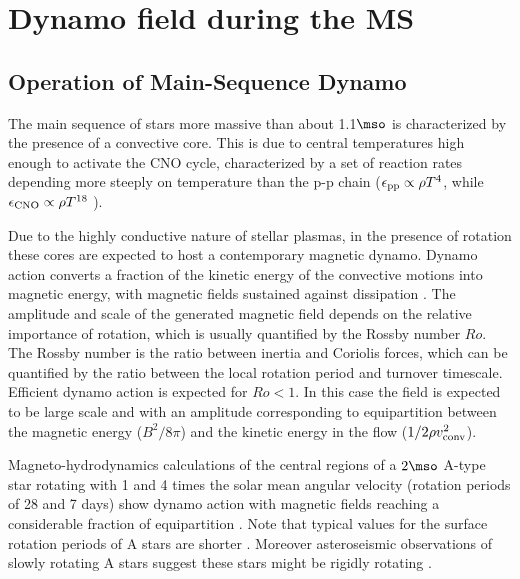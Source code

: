 \section{Dynamo field during the MS}
\subsection{Operation of Main-Sequence Dynamo}
The main sequence of stars more massive than about 1.1$\mso$ is characterized by the presence of a convective core.
This is due to central temperatures high enough to activate the CNO cycle, characterized by a set of reaction rates depending more steeply on temperature than the p-p chain ($\epsilon_{\rm pp}\propto \rho T^{4}$, while $\epsilon_{\rm CNO}\propto \rho T^{18}$ ).

Due to the highly conductive nature of stellar plasmas, in the presence of rotation
these cores are expected to host a contemporary magnetic dynamo. Dynamo action converts a fraction of the kinetic energy 
of the convective motions into magnetic energy, with magnetic fields sustained against dissipation  \citep[see e.g.,][]{Brandenburg_2005}. The amplitude and scale of the generated magnetic field depends on the relative importance of rotation, which is usually quantified by the Rossby number $Ro$. The Rossby number is the ratio between inertia and Coriolis forces, which can be quantified by the ratio between the local rotation period and turnover timescale. 
Efficient dynamo action is expected for $Ro<1$. In this case the field is expected to be large scale and with an amplitude corresponding to equipartition between the magnetic energy ($B^2/8\pi$) and the kinetic energy in the flow ($1/2\rho v^2_{\rm conv}$). 

Magneto-hydrodynamics calculations of the central regions of a $2\mso$ A-type star rotating with 
1 and 4 times the solar mean angular velocity (rotation periods of 28 and 7 days) show dynamo action 
with magnetic fields reaching a considerable fraction of equipartition \citep{Brun_2005}. Note that typical values for the surface  rotation periods of A stars are shorter \citep[about 1 day, see e.g.][]{Zorec_2012}. Moreover asteroseismic observations of slowly rotating A stars suggest these stars might be rigidly rotating \cite{Kurtz_2014}.

